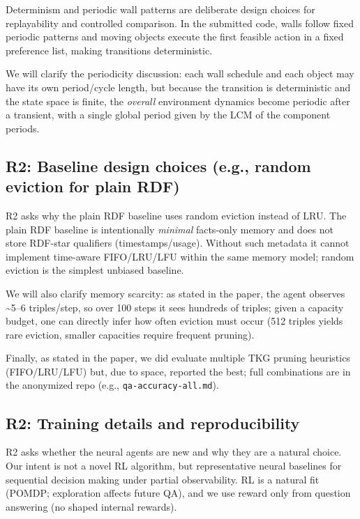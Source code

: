 \documentclass[runningheads]{llncs}
\begin{document}
Determinism and periodic wall patterns are deliberate design choices for replayability and controlled comparison. In the submitted code, walls follow fixed periodic patterns and moving objects execute the first feasible action in a fixed preference list, making transitions deterministic.

We will clarify the periodicity discussion: each wall schedule and each object may have its own period/cycle length, but because the transition is deterministic and the state space is finite, the \emph{overall} environment dynamics become periodic after a transient, with a single global period given by the LCM of the component periods.

\subsection*{R2: Baseline design choices (e.g., random eviction for plain RDF)}

R2 asks why the plain RDF baseline uses random eviction instead of LRU. The plain RDF baseline is intentionally \emph{minimal} facts-only memory and does not store RDF-star qualifiers (timestamps/usage). Without such metadata it cannot implement time-aware FIFO/LRU/LFU within the same memory model; random eviction is the simplest unbiased baseline.

We will also clarify memory scarcity: as stated in the paper, the agent observes \textasciitilde 5--6 triples/step, so over 100 steps it sees hundreds of triples; given a capacity budget, one can directly infer how often eviction must occur (512 triples yields rare eviction, smaller capacities require frequent pruning).

Finally, as stated in the paper, we did evaluate multiple TKG pruning heuristics (FIFO/LRU/LFU) but, due to space, reported the best; full combinations are in the anonymized repo (e.g., \texttt{qa-accuracy-all.md}).

\subsection*{R2: Training details and reproducibility}

R2 asks whether the neural agents are new and why they are a natural choice. Our intent is not a novel RL algorithm, but representative neural baselines for sequential decision making under partial observability. RL is a natural fit (POMDP; exploration affects future QA), and we use reward only from question answering (no shaped internal rewards).
\end{document}
